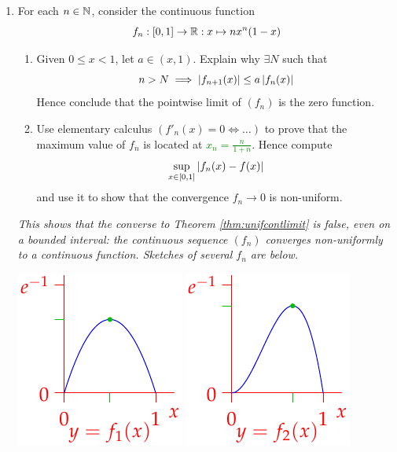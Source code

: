 \begin{exercises}
\begin{enumerate}
	
		\item\label{ex:classicnonuniform} For each $n\in\mathbb{N}$, consider the continuous function
		\[
			f_n:[0,1]\to\mathbb{R}:x\mapsto nx^n(1-x)
		\]
		\begin{enumerate}
		  \item Given $0\le x<1$, let $a\in(x,1)$. Explain why
		  $\exists N$ such that
		  \[
		  	n>N\implies \left| f_{n+1}(x)\right|\le a\left| f_n(x)\right|
		  \]
		  Hence conclude that the pointwise limit of $(f_n)$ is the zero function.
		  \item Use elementary calculus $(f'_n(x)=0\Longleftrightarrow\ldots)$ to prove that the maximum value of $f_n$ is located at \textcolor{Green}{$x_n=\frac n{1+n}$}. Hence compute
			\[
				\sup_{x\in[0,1]}\left| f_n(x)-f(x)\right|
			\]
			and use it to show that the convergence $f_n\to 0$ is non-uniform.
		\end{enumerate}
		\emph{This shows that the converse to Theorem \ref{thm:unifcontlimit} is false, even on a bounded interval: the continuous sequence $(f_n)$ converges \emph{non-uniformly} to a continuous function. Sketches of several $f_n$ are below.} 
		\begin{center}
			\includegraphics[scale=0.95]{seqex5}\hfill
			\includegraphics[scale=0.95]{seqex6}\hfill 

\end{center}
\end{enumerate}
\end{exercises}
